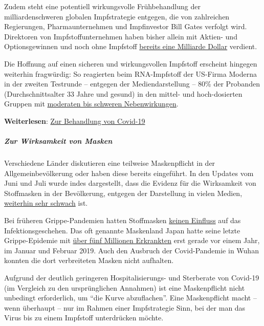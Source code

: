 Zudem steht eine potentiell wirkungsvolle Frühbehandlung der
milliardenschweren globalen Impfstrategie entgegen, die von zahlreichen
Regierungen, Pharmaunternehmen und Impfinvestor Bill Gates verfolgt
wird. Direktoren von Impfstoffunternehmen haben bisher allein mit
Aktien- und Optionsgewinnen und noch ohne Impfstoff
\href{https://www.nytimes.com/2020/07/25/business/coronavirus-vaccine-profits-vaxart.html}{bereits
eine Milliarde Dollar} verdient.

Die Hoffnung auf einen sicheren und wirkungsvollen Impfstoff erscheint
hingegen weiterhin fragwürdig: So reagierten beim RNA-Impfstoff der
US-Firma Moderna in der zweiten Testrunde -- entgegen der
Mediendarstellung -- 80\% der Probanden (Durchschnittsalter 33 Jahre und
gesund) in den mittel- und hoch-dosierten Gruppen mit
\href{https://childrenshealthdefense.org/news/vaccines/letter-to-wv-legislators-the-moderna-covid-19-vaccine-is-likely-to-make-more-people-sick-than-covid-19/}{moderaten
bis schweren Nebenwirkungen}.

\textbf{Weiterlesen}:
\href{https://swprs.org/zur-behandlung-von-covid-19/}{Zur Behandlung von
Covid-19}

\hypertarget{zur-wirksamkeit-von-masken}{%
\subparagraph{\texorpdfstring{\textbf{Zur Wirksamkeit von
Masken}}{Zur Wirksamkeit von Masken}}\label{zur-wirksamkeit-von-masken}}

Verschiedene Länder diskutieren eine teilweise Maskenpflicht in der
Allgemeinbevölkerung oder haben diese bereits eingeführt. In den Updates
vom Juni und Juli wurde indes dargestellt, dass die Evidenz für die
Wirksamkeit von Stoffmasken in der Bevölkerung, entgegen der Darstellung
in vielen Medien,
\href{https://swprs.org/face-masks-evidence/}{weiterhin sehr schwach}
ist.

Bei früheren Grippe-Pandemien hatten Stoffmasken
\href{https://wwwnc.cdc.gov/eid/article/26/5/19-0994_article}{keinen
Einfluss} auf das Infektions­geschehen. Das oft genannte Maskenland
Japan hatte seine letzte Grippe-Epidemie mit
\href{https://www.upi.com/Top_News/World-News/2019/02/01/Millions-in-Japan-affected-as-flu-outbreak-grips-country/9191549043797/}{über
fünf Millionen Erkrankten} erst gerade vor einem Jahr, im Januar und
Februar 2019. Auch den Ausbruch der Covid-Pandemie in Wuhan konnten die
dort verbreiteten Masken nicht aufhalten.

Aufgrund der deutlich geringeren Hospitalisierungs- und Sterberate von
Covid-19 (im Vergleich zu den ursprünglichen Annahmen) ist eine
Maskenpflicht nicht unbedingt erforderlich, um ``die Kurve
abzuflachen''. Eine Maskenpflicht macht -- wenn überhaupt -- nur im
Rahmen einer Impfstrategie Sinn, bei der man das Virus bis zu einem
Impfstoff unterdrücken möchte.

